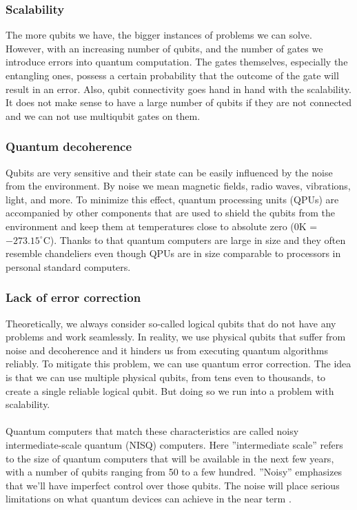 \subsubsection{Scalability}
The more qubits we have, the bigger instances of problems we can solve. However, with an increasing number of qubits, and the number of gates we introduce errors into quantum computation. The gates themselves, especially the entangling ones, possess a certain probability that the outcome of the gate will result in an error. Also, qubit connectivity goes hand in hand with the scalability. It does not make sense to have a large number of qubits if they are not connected and we can not use multiqubit gates on them.

\subsubsection{Quantum decoherence}
Qubits are very sensitive and their state can be easily influenced by the noise from the environment. By noise we mean magnetic fields, radio waves, vibrations, light, and more. To minimize this effect, quantum processing units (QPUs) are accompanied by other components that are used to shield the qubits from the environment and keep them at temperatures close to absolute zero ($0$K = $-273.15^{\circ}$C). Thanks to that quantum computers are large in size and they often resemble chandeliers even though QPUs are in size comparable to processors in personal standard computers.

\subsubsection{Lack of error correction}
Theoretically, we always consider so-called logical qubits that do not have any problems and work seamlessly. In reality, we use physical qubits that suffer from noise and decoherence and it hinders us from executing quantum algorithms reliably. To mitigate this problem, we can use quantum error correction. The idea is that we can use multiple physical qubits, from tens even to thousands, to create a single reliable logical qubit. But doing so we run into a problem with scalability. 

\paragraph{}
Quantum computers that match these characteristics are called noisy intermediate-scale quantum (NISQ) computers. Here ''intermediate scale'' refers to the size of quantum computers that will be available in the next few years, with a number of qubits ranging from 50 to a few hundred. ''Noisy'' emphasizes that we'll have imperfect control over those qubits. The noise will place serious limitations on what quantum devices can achieve in the near term \cite{preskill_nisq}.


